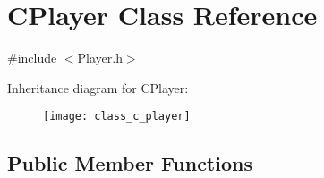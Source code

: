 \hypertarget{class_c_player}{}\section{C\+Player Class Reference}
\label{class_c_player}


{\ttfamily \#include $<$Player.\+h$>$}

Inheritance diagram for C\+Player\+:\begin{figure}[H]
\begin{center}
\leavevmode
\texttt{[image: class\_c\_player]}
\end{center}
\end{figure}
\subsection*{Public Member Functions}
